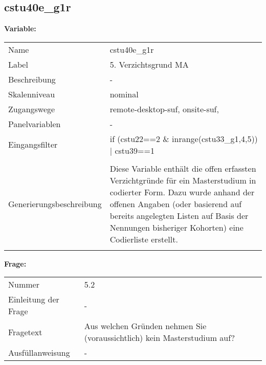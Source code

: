 	
	
	\subsection{cstu40e\_g1r}
	\label{subSection:cstu40e_g1r}

	\noindent\textbf{Variable:}\\
		\begin{tabular}{lL{11.3cm}}
			\label{tableVariable:cstu40e_g1r}
			Name & cstu40e\_g1r \\
			Label & 5. Verzichtsgrund MA \\
			Beschreibung & - \\
			Skalenniveau & nominal \\
			Zugangswege &
				remote-desktop-suf,
				onsite-suf,
 \\
			Panelvariablen & -
			 \\
			Eingangsfilter & if (cstu22==2 \& inrange(cstu33\_g1,4,5)) | cstu39==1 \\
 \\
					Generierungsbeschreibung & Diese Variable enthält die offen erfassten Verzichtgründe für ein Masterstudium in codierter Form. Dazu wurde anhand der offenen Angaben (oder basierend auf bereits angelegten Listen auf Basis der Nennungen bisheriger Kohorten) eine Codierliste erstellt.
				 \\	
			 \\
		\end{tabular}

		\vspace*{1 cm}
		\noindent\textbf{Frage:}\\
		\begin{tabular}{lL{11.3cm}}
			\label{tableQuestion:cstu40e_g1r}
			Nummer & 5.2 \\
			Einleitung der Frage & - \\
			Fragetext & Aus welchen Gründen nehmen Sie (voraussichtlich) kein Masterstudium auf? \\
			Ausfüllanweisung & - \\
		\end{tabular}





